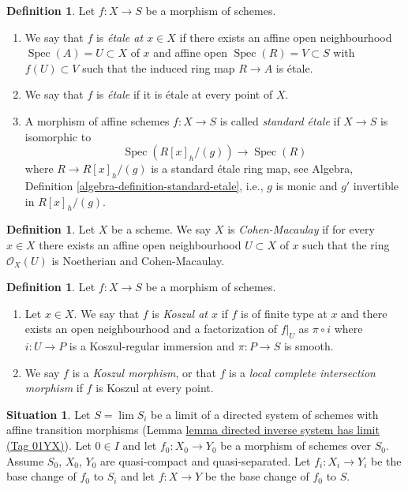 \documentclass{amsart}
\theoremstyle{plain}
\theoremstyle{definition}
\newtheorem{definition}[subsection]{Definition}
\newtheorem{situation}[subsection]{Situation}
\theoremstyle{remark}
\numberwithin{equation}{subsection}
\def\lim{\mathop{\mathrm{lim}}\nolimits}
\def\Spec{\mathop{\mathrm{Spec}}}
\begin{document}
\begin{definition}
\label{morphisms-definition-etale}
Let $f : X \to S$ be a morphism of schemes.
\begin{enumerate}
\item We say that $f$ is {\it \'etale at $x \in X$} if
there exists an affine open neighbourhood $\Spec(A) = U \subset X$
of $x$ and affine open $\Spec(R) = V \subset S$
with $f(U) \subset V$ such that the induced ring map
$R \to A$ is \'etale.
\item We say that $f$ is {\it \'etale} if it is \'etale at every point of $X$.
\item A morphism of affine schemes $f : X \to S$ is called
{\it standard \'etale} if $X \to S$ is isomorphic to
$$
\Spec(R[x]_h/(g)) \to \Spec(R)
$$
where $R \to R[x]_h/(g)$ is a standard \'etale ring map, see
Algebra, Definition \ref{algebra-definition-standard-etale},
i.e., $g$ is monic and $g'$ invertible in $R[x]_h/(g)$.
\end{enumerate}
\end{definition}

\begin{definition}
\label{properties-definition-Cohen-Macaulay}
Let $X$ be a scheme. We say $X$ is {\it Cohen-Macaulay} if
for every $x \in X$ there exists an affine open neighbourhood
$U \subset X$ of $x$ such that the ring $\mathcal{O}_X(U)$ is
Noetherian and Cohen-Macaulay.
\end{definition}

\begin{definition}
\label{more-morphisms-definition-lci}
Let $f : X \to S$ be a morphism of schemes.
\begin{enumerate}
\item Let $x \in X$. We say that $f$ is {\it Koszul at $x$} if $f$
is of finite type at $x$ and there exists an open neighbourhood
and a factorization of $f|_U$ as $\pi \circ i$ where $i : U \to P$
is a Koszul-regular immersion and $\pi : P \to S$ is smooth.
\item We say $f$ is a {\it Koszul morphism}, or that
$f$ is a {\it local complete intersection morphism}
if $f$ is Koszul at every point.
\end{enumerate}
\end{definition}

\begin{situation}
\label{limits-situation-descent-property}
Let $S = \lim S_i$ be a limit of a directed system of schemes
with affine transition morphisms
(Lemma \href{https://stacks.math.columbia.edu/tag/01YX}{lemma directed inverse system has limit (Tag 01YX)}).
Let $0 \in I$ and let $f_0 : X_0 \to Y_0$ be a morphism of schemes over $S_0$.
Assume $S_0$, $X_0$, $Y_0$ are quasi-compact and quasi-separated.
Let $f_i : X_i \to Y_i$ be the base change of $f_0$ to $S_i$ and
let $f : X \to Y$ be the base change of $f_0$ to $S$.
\end{situation}
\end{document}
